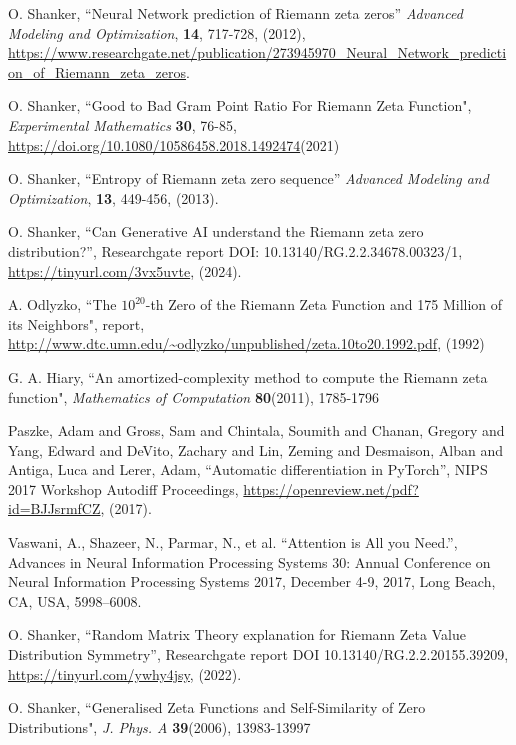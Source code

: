 \documentclass[twoside]{article}
\begin{document}

\begin{thebibliography}{10}

 O. Shanker, ``Neural Network prediction of Riemann zeta zeros''
{\it Advanced Modeling and Optimization}, {\bf 14}, 717-728, (2012), \url{https://www.researchgate.net/publication/273945970_Neural_Network_prediction_of_Riemann_zeta_zeros}.


 O. Shanker, 
``Good to Bad Gram Point Ratio For Riemann Zeta Function",
{\it Experimental Mathematics} {\bf 30}, 76-85,
\url{https://doi.org/10.1080/10586458.2018.1492474}(2021)

 O. Shanker, ``Entropy of Riemann zeta zero sequence''
{\it Advanced Modeling and Optimization}, {\bf 13}, 449-456, (2013). 

 O. Shanker, 
``Can Generative AI understand the Riemann zeta zero distribution?'',
 Researchgate report DOI: 10.13140/RG.2.2.34678.00323/1,
\url{https://tinyurl.com/3vx5uvte}, 
(2024). 

  A. Odlyzko,
``The $10^{20}$-th Zero of the Riemann Zeta
Function and 175 Million of its Neighbors", report,
\url{http://www.dtc.umn.edu/~odlyzko/unpublished/zeta.10to20.1992.pdf}, (1992)

 G. A. Hiary,
``An amortized-complexity method to compute the Riemann zeta function", 
{\it Mathematics of Computation} {\bf80}(2011), 1785-1796


 Paszke, Adam and Gross, Sam and Chintala, Soumith and Chanan, Gregory and Yang, Edward and DeVito, Zachary and Lin, Zeming and Desmaison, Alban and Antiga, Luca and Lerer, Adam, 
``Automatic differentiation in PyTorch'',
 NIPS 2017 Workshop Autodiff Proceedings,
\url{https://openreview.net/pdf?id=BJJsrmfCZ}, 
(2017). 

 Vaswani, A., Shazeer, N., Parmar, N., et al. 
``Attention is All you Need.'', 
Advances in Neural Information Processing Systems 30: Annual Conference                    on Neural Information Processing Systems 2017, December 4-9, 2017,  Long Beach, CA, USA, 5998--6008.

 O. Shanker, 
``Random Matrix Theory explanation for Riemann Zeta Value Distribution Symmetry'',
 Researchgate report DOI 10.13140/RG.2.2.20155.39209,
\url{https://tinyurl.com/ywhy4jsy}, 
(2022). 


 O. Shanker, 
``Generalised Zeta Functions and Self-Similarity of Zero Distributions",
{\it J.  Phys. A} {\bf39}(2006), 13983-13997


\end{thebibliography}
\end{document}
